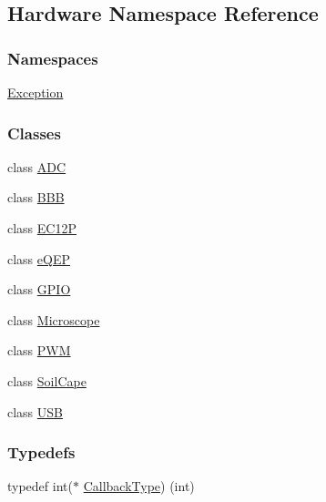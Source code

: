 \hypertarget{namespace_hardware}{}\subsection{Hardware Namespace Reference}
\label{namespace_hardware}
\subsubsection*{Namespaces}
\begin{DoxyCompactItemize}
\item 
 \hyperlink{namespace_hardware_1_1_exception}{Exception}
\end{DoxyCompactItemize}
\subsubsection*{Classes}
\begin{DoxyCompactItemize}
\item 
class \hyperlink{class_hardware_1_1_a_d_c}{A\+D\+C}
\item 
class \hyperlink{class_hardware_1_1_b_b_b}{B\+B\+B}
\item 
class \hyperlink{class_hardware_1_1_e_c12_p}{E\+C12\+P}
\item 
class \hyperlink{class_hardware_1_1e_q_e_p}{e\+Q\+E\+P}
\item 
class \hyperlink{class_hardware_1_1_g_p_i_o}{G\+P\+I\+O}
\item 
class \hyperlink{class_hardware_1_1_microscope}{Microscope}
\item 
class \hyperlink{class_hardware_1_1_p_w_m}{P\+W\+M}
\item 
class \hyperlink{class_hardware_1_1_soil_cape}{Soil\+Cape}
\item 
class \hyperlink{class_hardware_1_1_u_s_b}{U\+S\+B}
\end{DoxyCompactItemize}
\subsubsection*{Typedefs}
\begin{DoxyCompactItemize}
\item 
typedef int($\ast$ \hyperlink{namespace_hardware_a5ba2e4bdfa2bbd8b551b1d5b2a0c61fd}{Callback\+Type}) (int)
\end{DoxyCompactItemize}
